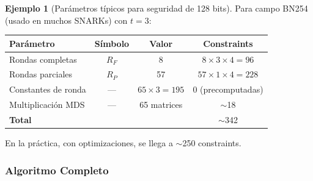 \documentclass[11pt,a4paper,twoside,openright]{book}
\theoremstyle{definition}
\newtheorem{example}{Ejemplo}[chapter]
\theoremstyle{plain}
\theoremstyle{remark}
\begin{document}
\begin{example}[Parámetros típicos para seguridad de 128 bits]
Para campo BN254 (usado en muchos SNARKs) con $t = 3$:
\begin{center}
\begin{tabular}{lccc}
\toprule
\textbf{Parámetro} & \textbf{Símbolo} & \textbf{Valor} & \textbf{Constraints} \\
\midrule
Rondas completas & $R_F$ & 8 & $8 \times 3 \times 4 = 96$ \\
Rondas parciales & $R_P$ & 57 & $57 \times 1 \times 4 = 228$ \\
Constantes de ronda & --- & $65 \times 3 = 195$ & 0 (precomputadas) \\
Multiplicación MDS & --- & 65 matrices & $\sim$18 \\
\midrule
\textbf{Total} & & & $\sim$342 \\
\bottomrule
\end{tabular}
\end{center}

En la práctica, con optimizaciones, se llega a $\sim$250 constraints.
\end{example}

\subsubsection{Algoritmo Completo}
\end{document}
